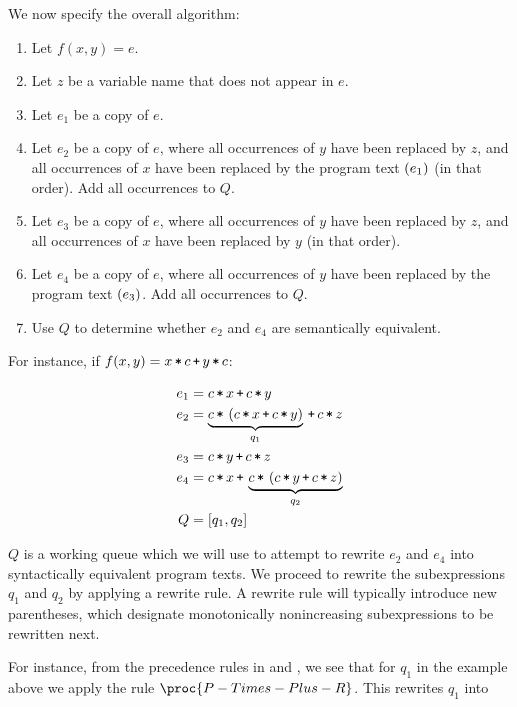 We now specify the overall algorithm:

\begin{enumerate}

\item Let $f(x,y)=e$.

\item Let $z$ be a variable name that does not appear in $e$.

\item Let $e_1$ be a copy of $e$.

\item Let $e_2$ be a copy of $e$, where all occurrences of $y$ have been
replaced by $z$, and all occurrences of $x$ have been replaced by the program
text $\left({e_1}\right)$ (in that order). Add all occurrences to $Q$.

\item Let $e_3$ be a copy of $e$, where all occurrences of $y$ have been
replaced by $z$, and all occurrences of $x$ have been replaced by $y$ (in that
order).

\item Let $e_4$ be a copy of $e$, where all occurrences of $y$ have been
replaced by the program text $\left({e_3}\right)$. Add all occurrences to $Q$.

\item Use $Q$ to determine whether $e_2$ and $e_4$ are semantically equivalent.

\end{enumerate}

For instance, if $f(x,y)=x\lt c \lp y\lt c$:

\begin{align*}
e_1 &= c\lt x \lp c\lt y \\
e_2 &= \underbrace{c \lt \p{c\lt x \lp c\lt y}}_{q_1} \lp c \lt z \\
e_3 &= c\lt y \lp c \lt z \\
e_4 &= c \lt x \lp \underbrace{c \lt \p{ c \lt y \lp c \lt z }}_{q_2} \\
Q &= \seq{q_1, q_2 }
\end{align*}

$Q$ is a working queue which we will use to attempt to rewrite $e_2$ and $e_4$
into syntactically equivalent program texts. We proceed to rewrite the
subexpressions $q_1$ and $q_2$ by applying a rewrite rule. A rewrite rule will
typically introduce new parentheses, which designate monotonically
nonincreasing subexpressions to be rewritten next.

For instance, from the precedence rules in  and
, we see that for $q_1$ in the example above we apply
the rule $\proc{P-Times-Plus-R}$. This rewrites $q_1$ into

